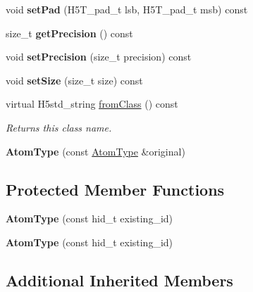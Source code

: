 \begin{DoxyCompactItemize}
void {\bfseries set\+Pad} (H5\+T\+\_\+pad\+\_\+t lsb, H5\+T\+\_\+pad\+\_\+t msb) const
\item 
\mbox{\label{class_h5_1_1_atom_type_a7b716513bf9d91062acc65e6b614cd38}} 
size\+\_\+t {\bfseries get\+Precision} () const
\item 
\mbox{\label{class_h5_1_1_atom_type_aa764d901764a47660ab2ef5a11427c91}} 
void {\bfseries set\+Precision} (size\+\_\+t precision) const
\item 
\mbox{\label{class_h5_1_1_atom_type_a3821ea87f18925958ec200324995fcad}} 
void {\bfseries set\+Size} (size\+\_\+t size) const
\item 
\mbox{\label{class_h5_1_1_atom_type_a78b16fea33b398b689fd8c8512f59f49}} 
virtual H5std\+\_\+string \hyperlink{class_h5_1_1_atom_type_a78b16fea33b398b689fd8c8512f59f49}{from\+Class} () const
\begin{DoxyCompactList}\small\item\em Returns this class name. \end{DoxyCompactList}\item 
\mbox{\label{class_h5_1_1_atom_type_a38f79570d4fc0bc30f8421d6ebbb7642}} 
{\bfseries Atom\+Type} (const \hyperlink{class_h5_1_1_atom_type}{Atom\+Type} \&original)
\end{DoxyCompactItemize}
\subsection*{Protected Member Functions}
\begin{DoxyCompactItemize}
\item 
\mbox{\label{class_h5_1_1_atom_type_ac597420fca15cc22cd3bc1d6596a020d}} 
{\bfseries Atom\+Type} (const hid\+\_\+t existing\+\_\+id)
\item 
\mbox{\label{class_h5_1_1_atom_type_ac597420fca15cc22cd3bc1d6596a020d}} 
{\bfseries Atom\+Type} (const hid\+\_\+t existing\+\_\+id)
\end{DoxyCompactItemize}
\subsection*{Additional Inherited Members}


